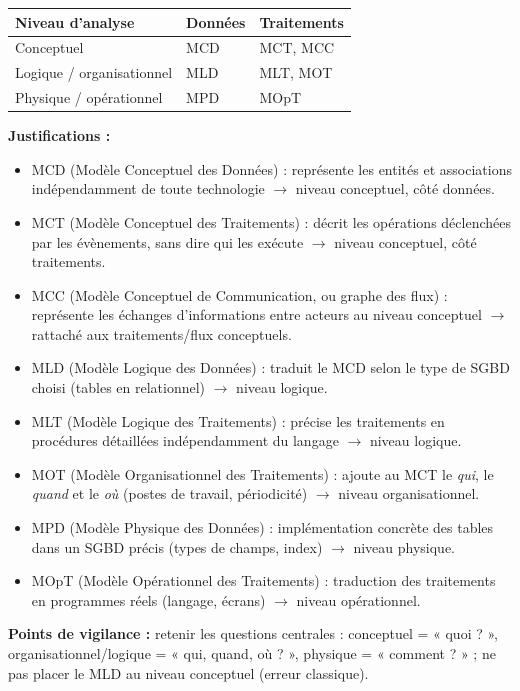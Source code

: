 \documentclass[11pt]{article}
\newcommand{\cle}[1]{{\popxbold\color{popdark}#1}}
\begin{document}
\begin{corrige}
\begin{center}
\begin{tabularx}{\linewidth}{|l|X|X|}
\hline
\rowcolor{popblueL} \textbf{Niveau d'analyse} & \textbf{Données} & \textbf{Traitements} \\
\hline
Conceptuel & MCD & MCT, MCC \\
\hline
Logique / organisationnel & MLD & MLT, MOT \\
\hline
Physique / opérationnel & MPD & MOpT \\
\hline
\end{tabularx}
\end{center}
\textbf{Justifications :}
\begin{itemize}
  \item \cle{MCD} (Modèle Conceptuel des Données) : représente les entités et associations indépendamment de toute technologie $\to$ niveau conceptuel, côté données.
  \item \cle{MCT} (Modèle Conceptuel des Traitements) : décrit les opérations déclenchées par les évènements, sans dire qui les exécute $\to$ niveau conceptuel, côté traitements.
  \item \cle{MCC} (Modèle Conceptuel de Communication, ou graphe des flux) : représente les échanges d'informations entre acteurs au niveau conceptuel $\to$ rattaché aux traitements/flux conceptuels.
  \item \cle{MLD} (Modèle Logique des Données) : traduit le MCD selon le type de SGBD choisi (tables en relationnel) $\to$ niveau logique.
  \item \cle{MLT} (Modèle Logique des Traitements) : précise les traitements en procédures détaillées indépendamment du langage $\to$ niveau logique.
  \item \cle{MOT} (Modèle Organisationnel des Traitements) : ajoute au MCT le \emph{qui}, le \emph{quand} et le \emph{où} (postes de travail, périodicité) $\to$ niveau organisationnel.
  \item \cle{MPD} (Modèle Physique des Données) : implémentation concrète des tables dans un SGBD précis (types de champs, index) $\to$ niveau physique.
  \item \cle{MOpT} (Modèle Opérationnel des Traitements) : traduction des traitements en programmes réels (langage, écrans) $\to$ niveau opérationnel.
\end{itemize}
\textbf{Points de vigilance :} retenir les questions centrales : conceptuel = « quoi ? », organisationnel/logique = « qui, quand, où ? », physique = « comment ? » ; ne pas placer le MLD au niveau conceptuel (erreur classique).
\end{corrige}
\end{document}
